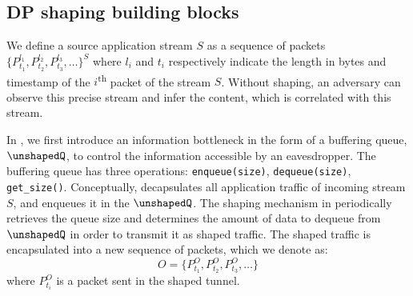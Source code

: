 



\subsection{DP shaping building blocks}
\label{subsec:infromation-bottleneck}
We define a source application stream $S$ as a sequence of packets
$\{P_{t_1}^{l_1}, P_{t_2}^{l_2}, P_{t_3}^{l_3}, \dots \}^S$
where $l_i$ and $t_i$ respectively indicate the length in bytes and timestamp of
the $i$\textsuperscript{th} packet of the stream $S$.
%
Without shaping, an adversary can observe this precise stream and infer
the content, which is correlated with this stream.

In {\sys}, we first introduce an information bottleneck in the form of a
buffering queue, {$\unshapedQ$}, to control the information accessible by an
eavesdropper. The buffering queue has three operations: \texttt{enqueue(size)},
\texttt{dequeue(size)}, \texttt{get\_size()}.
Conceptually, {\sys} decapsulates all application traffic of incoming stream
$S$, and enqueues it in the {$\unshapedQ$}.
The shaping mechanism in {\sys} periodically retrieves the queue size and
determines the amount of data to dequeue from $\unshapedQ$ in order to transmit
it as shaped traffic.
The shaped traffic is encapsulated into a new sequence of packets, which we
denote as:
\begin{equation}\label{equ:stream-segs}
    O = \{P_{t_1}^O, P_{t_2}^O, P_{t_3}^O, \dots\}
\end{equation}
where $P_{t_i}^O$ is a packet sent in the shaped tunnel.

